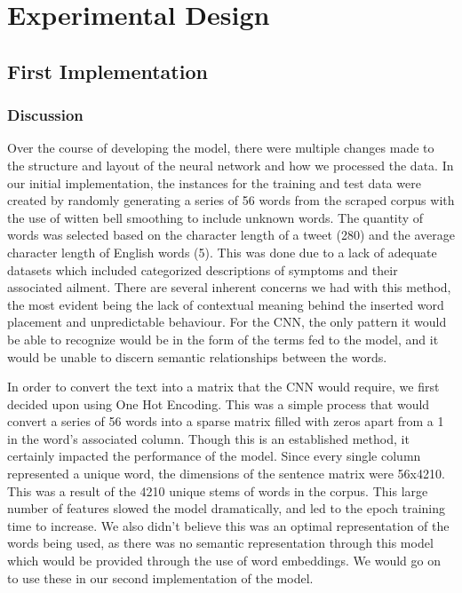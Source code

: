 \documentclass[12pt]{report}
\begin{document}
\chapter{Experimental Design}
\section{First Implementation}
\subsection{Discussion}
Over the course of developing the model, there were multiple changes made to the 
structure and layout of the neural network and how we processed the data. In our 
initial implementation, the instances for the training and test data were created 
by randomly generating a series of 56 words from the scraped corpus with the use 
of witten bell smoothing to include unknown words. The quantity of words was selected 
based on the character length of a tweet (280) and the average character length of 
English words (5). This was done due to a lack of adequate datasets which included 
categorized descriptions of symptoms and their associated ailment. There are several 
inherent concerns we had with this method, the most evident being the lack of contextual 
meaning behind the inserted word placement and unpredictable behaviour. For the CNN, the 
only pattern it would be able to recognize would be in the form of the terms fed to the 
model, and it would be unable to discern semantic relationships between the words.

In order to convert the text into a matrix that the CNN would require, we first decided 
upon using One Hot Encoding. This was a simple process that would convert a series of 56 
words into a sparse matrix filled with zeros apart from a 1 in the word’s associated column. 
Though this is an established method, it certainly impacted the performance of the model. 
Since every single column represented a unique word, the dimensions of the sentence matrix 
were 56x4210. This was a result of the 4210 unique stems of words in the corpus. This large 
number of features slowed the model dramatically, and led to the epoch training time to increase. 
We also didn’t believe this was an optimal representation of the words being used, as there was 
no semantic representation through this model which would be provided through the use of word 
embeddings. We would go on to use these in our second implementation of the model.
\end{document}
